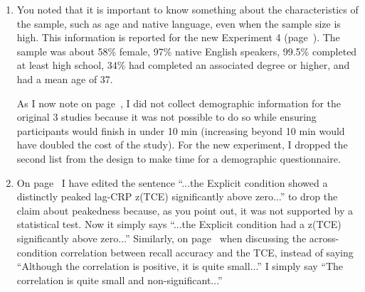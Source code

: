 \documentclass[12pt]{article}
\begin{document}
\begin{enumerate}
\item
	You noted that it is important to know something about the characteristics of the sample, such as age and native language, even when the sample size is high. This information is reported for the new Experiment 4 (page~\pageref{newexp}). The sample was about 58\% female, 97\% native English speakers, 99.5\% completed at least high school, 34\% had completed an associated degree or higher, and had a mean age of 37.

	As I now note on page~\pageref{TODO-10}, I did not collect demographic information for the original 3 studies because it was not possible to do so while ensuring participants would finish in under 10 min (increasing beyond 10 min would have doubled the cost of the study). For the new experiment, I dropped the second list from the design to make time for a demographic questionnaire. %

\item
	On page~\pageref{done-11} I have edited the sentence ``...the Explicit condition showed a distinctly peaked lag-CRP z(TCE) significantly above zero...'' to drop the claim about peakedness because, as you point out, it was not supported by a statistical test. Now it simply says ``...the Explicit condition had a z(TCE) significantly above zero...''
	Similarly, on page~\pageref{done-12} when discussing the across-condition correlation between recall accuracy and the TCE, instead of saying ``Although the correlation is positive, it is quite small...'' I simply say ``The correlation is quite small and non-significant...'' %


\end{enumerate}
\end{document}

